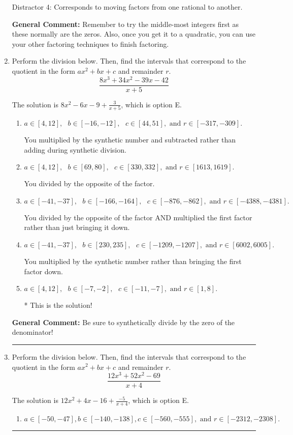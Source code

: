 \documentclass{extbook}[14pt]
\newcommand{\litem}[1]{\item #1

\rule{\textwidth}{0.4pt}}
\begin{document}
\begin{enumerate}
{\begin{enumerate}[label=\Alph*.]
 Distractor 4: Corresponds to moving factors from one rational to another.
\end{enumerate}

\textbf{General Comment:} Remember to try the middle-most integers first as these normally are the zeros. Also, once you get it to a quadratic, you can use your other factoring techniques to finish factoring.
}
\litem{
Perform the division below. Then, find the intervals that correspond to the quotient in the form $ax^2+bx+c$ and remainder $r$.
\[ \frac{8x^{3} +34 x^{2} -39 x -42}{x + 5} \]

The solution is \( 8x^{2} -6 x -9 + \frac{3}{x + 5} \), which is option E.\begin{enumerate}[label=\Alph*.]
\item \( a \in [4, 12], \text{   } b \in [-16, -12], \text{   } c \in [44, 51], \text{   and   } r \in [-317, -309]. \)

 You multiplied by the synthetic number and subtracted rather than adding during synthetic division.
\item \( a \in [4, 12], \text{   } b \in [69, 80], \text{   } c \in [330, 332], \text{   and   } r \in [1613, 1619]. \)

 You divided by the opposite of the factor.
\item \( a \in [-41, -37], \text{   } b \in [-166, -164], \text{   } c \in [-876, -862], \text{   and   } r \in [-4388, -4381]. \)

 You divided by the opposite of the factor AND multiplied the first factor rather than just bringing it down.
\item \( a \in [-41, -37], \text{   } b \in [230, 235], \text{   } c \in [-1209, -1207], \text{   and   } r \in [6002, 6005]. \)

 You multiplied by the synthetic number rather than bringing the first factor down.
\item \( a \in [4, 12], \text{   } b \in [-7, -2], \text{   } c \in [-11, -7], \text{   and   } r \in [1, 8]. \)

* This is the solution!
\end{enumerate}

\textbf{General Comment:} Be sure to synthetically divide by the zero of the denominator!
}
\litem{
Perform the division below. Then, find the intervals that correspond to the quotient in the form $ax^2+bx+c$ and remainder $r$.
\[ \frac{12x^{3} +52 x^{2} -69}{x + 4} \]

The solution is \( 12x^{2} +4 x -16 + \frac{-5}{x + 4} \), which is option E.\begin{enumerate}[label=\Alph*.]
\item \( a \in [-50, -47], b \in [-140, -138], c \in [-560, -555], \text{ and } r \in [-2312, -2308]. \)


\end{enumerate}}
\end{enumerate}
\end{document}
